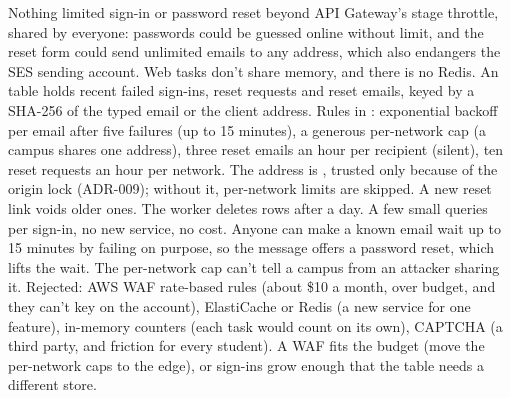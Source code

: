   {Nothing limited sign-in or password reset beyond API Gateway's stage throttle, shared by
   everyone: passwords could be guessed online without limit, and the reset form could send
   unlimited emails to any address, which also endangers the SES sending account. Web tasks
   don't share memory, and there is no Redis.}
  {An  table holds recent failed sign-ins, reset requests and reset emails,
   keyed by a SHA-256 of the typed email or the client address. Rules in
   : exponential backoff per email after five failures (up to 15
   minutes), a generous per-network cap (a campus shares one address), three reset emails an
   hour per recipient (silent), ten reset requests an hour per network. The address is
   , trusted only because of the origin lock (ADR-009); without
   it, per-network limits are skipped. A new reset link voids older ones. The worker deletes
   rows after a day.}
  {A few small queries per sign-in, no new service, no cost. Anyone can make a known email wait
   up to 15 minutes by failing on purpose, so the message offers a password reset, which lifts
   the wait. The per-network cap can't tell a campus from an attacker sharing it. Rejected: AWS
   WAF rate-based rules (about \$10 a month, over budget, and they can't key on the account),
   ElastiCache or Redis (a new service for one feature), in-memory counters (each task would
   count on its own), CAPTCHA (a third party, and friction for every student).}
  {A WAF fits the budget (move the per-network caps to the edge), or sign-ins grow enough that
   the table needs a different store.}

